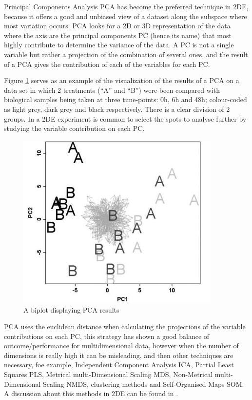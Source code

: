 Principal Components Analysis PCA has become the preferred technique in 2DE, because it offers a good and unbiased view of a dataset along the subspace where most variation occurs. PCA looks for a 2D or 3D representation of the data where the axis are the principal components PC (hence its name) that most highly contribute to determine the variance of the data. A PC is not a single variable but rather a projection of the combination of several ones, and the result of a PCA gives the contribution of each of the variables for each PC.

Figure \ref{fig:PCA} serves as an example of the visualization of the results of a PCA on a data set in which 2 treatments (``A'' and ``B'') were been compared with biological samples being taken at three time-points: 0h, 6h and 48h; colour-coded as light grey, dark grey and black respectively. There is a clear division of 2 groups. In a 2DE experiment is common to select the spots to analyse further by studying the variable contribution on each PC.

\begin{figure}  
\centering
\includegraphics[width=4in]{figures/PCA.png}
\caption[Example of a PCA result plot.]{A biplot displaying PCA results 
\label{fig:PCA}}
\end{figure}

PCA uses the euclidean distance when calculating the projections of the variable contributions on each PC, this strategy has shown a good balance of outcome/performance for multidimensional data, however when the number of dimensions is really high it can be misleading, and then other techniques are  necessary, foe example, Independent Component Analysis ICA, Partial Least Squares PLS, Metrical multi-Dimensional Scaling MDS, Non-Metrical multi-Dimensional Scaling NMDS, clustering methods and Self-Organised Maps SOM. A discussion about this methods in 2DE can be found in \cite{SIL2014}.



